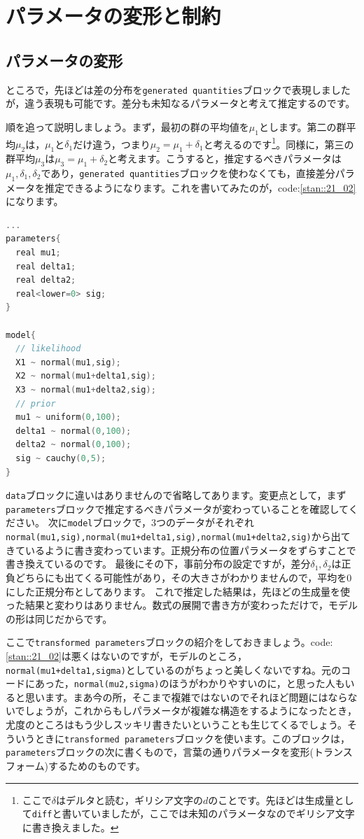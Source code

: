 \documentclass{ltjsbook}
\begin{document}
\section{パラメータの変形と制約}
\subsection{パラメータの変形}
ところで，先ほどは差の分布を\verb|generated quantities|ブロックで表現しましたが，違う表現も可能です。差分も未知なるパラメータと考えて推定するのです。

順を追って説明しましょう。まず，最初の群の平均値を$\mu_1$とします。第二の群平均$\mu_2$は，$\mu_1$と$\delta_1$だけ違う，つまり$\mu_2=\mu_1+\delta_1$と考えるのです\footnote{ここで$\delta$はデルタと読む，ギリシア文字の$d$のことです。先ほどは生成量として\verb|diff|と書いていましたが，ここでは未知のパラメータなのでギリシア文字に書き換えました。}。同様に，第三の群平均$\mu_3$は$\mu_3 = \mu_1+\delta_2$と考えます。こうすると，推定するべきパラメータは$\mu_1,\delta_1,\delta_2$であり，\verb|generated quantities|ブロックを使わなくても，直接差分パラメータを推定できるようになります。これを書いてみたのが，code:\ref{stan::21_02}になります。

\begin{lstlisting}[language=C++,label={stan::21_02},caption={差分を直接推定するコード}]
...
parameters{
  real mu1;
  real delta1;
  real delta2;
  real<lower=0> sig;
}

model{
  // likelihood
  X1 ~ normal(mu1,sig);
  X2 ~ normal(mu1+delta1,sig);
  X3 ~ normal(mu1+delta2,sig);
  // prior
  mu1 ~ uniform(0,100);
  delta1 ~ normal(0,100);
  delta2 ~ normal(0,100);
  sig ~ cauchy(0,5);
}

\end{lstlisting}

\verb|data|ブロックに違いはありませんので省略してあります。変更点として，まず\verb|parameters|ブロックで推定するべきパラメータが変わっていることを確認してください。
次に\verb|model|ブロックで，3つのデータがそれぞれ\verb|normal(mu1,sig),normal(mu1+delta1,sig),normal(mu1+delta2,sig)|から出てきているように書き変わっています。正規分布の位置パラメータをずらすことで書き換えているのです。
最後にその下，事前分布の設定ですが，差分$\delta_1,\delta_2$は正負どちらにも出てくる可能性があり，その大きさがわかりませんので，平均を0にした正規分布としてあります。
これで推定した結果は，先ほどの生成量を使った結果と変わりはありません。数式の展開で書き方が変わっただけで，モデルの形は同じだからです。

ここで\verb|transformed parameters|ブロックの紹介をしておきましょう。code:\ref{stan::21_02}は悪くはないのですが，モデルのところ，\verb|normal(mu1+delta1,sigma)|としているのがちょっと美しくないですね。元のコードにあった，\verb|normal(mu2,sigma)|のほうがわかりやすいのに，と思った人もいると思います。まあ今の所，そこまで複雑ではないのでそれほど問題にはならないでしょうが，これからもしパラメータが複雑な構造をするようになったとき，尤度のところはもう少しスッキリ書きたいということも生じてくるでしょう。そういうときに\verb|transformed parameters|ブロックを使います。このブロックは，\verb|parameters|ブロックの次に書くもので，言葉の通りパラメータを変形(トランスフォーム)するためのものです。
\end{document}
